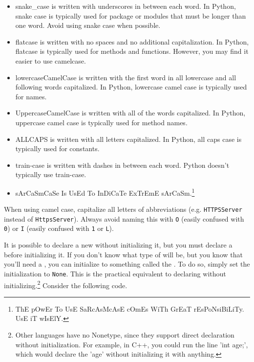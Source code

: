\begin{itemize}
    \item snake\_case is written with underscores in between each word. In Python, snake case is typically used for package or modules that must be longer than one word. Avoid using snake case when possible.
    \item flatcase is written with no spaces and no additional capitalization. In Python, flatcase is typically used for methods and functions. However, you may find it easier to use camelcase.
    \item lowercaseCamelCase is written with the first word in all lowercase and all following words capitalized. In Python, lowercase camel case is typically used for  names.
    \item UppercaseCamelCase is written with all of the words capitalized. In Python, uppercase camel case is typically used for method names.
    \item ALLCAPS is written with all letters capitalized. In Python, all caps case is typically used for constants.
    \item train-case is written with dashes in between each word. Python doesn't typically use train-case.
    \item sArCaSmCaSe Is UsEd To InDiCaTe ExTrEmE sArCaSm.\footnote{ThE pOwEr To UsE SaRcAsMcAsE cOmEs WiTh GrEaT rEsPoNsiBiLiTy. UsE iT wIsElY.}
\end{itemize}
When using camel case, capitalize all letters of abbreviations (e.g. \verb|HTTPSServer| instead of \verb|HttpsServer|). Always avoid naming this with \verb|O| (easily confused with \verb|0|) or \verb|I| (easily confused with \verb|1| or \verb|L|). \par
It is possible to declare a new  without initializing it, but you must declare a  before initializing it. If you don't know what type of  will be, but you know that you'll need a , you can initialize to something called the . To do so, simply set the initialization to \verb|None|. This is the practical equivalent to declaring without initializing.\footnote{Other languages have no Nonetype, since they support direct declaration without initialization. For example, in C++, you could run the line 'int age;', which would declare the 'age'  without initializing it with anything.} Consider the following code.\par
